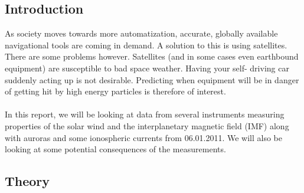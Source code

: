 \documentclass[norsk,a4paper,11pt]{article}
\begin{document}
\begin{multicols}{2}


\newpage

\section{Introduction} %
\label{sec:intro}
	As society moves towards more automatization, accurate, globally available navigational tools are coming in demand. A solution to this is using satellites. 			There are some problems however. Satellites (and in some cases even earthbound equipment) are susceptible to bad space weather. Having your self-			driving car suddenly acting up is not desirable. Predicting when equipment will be in danger of getting hit by high energy particles is therefore of interest.\\ 
	\\
	In this report, we will be looking at data from several instruments measuring properties of the solar wind and the interplanetary magnetic field (IMF) along 			with auroras and some ionospheric currents from 06.01.2011. We will also be looking at some potential consequences of the measurements.





\subsection{Theory} %
\label{sub:theory}

\end{multicols}
\end{document}

